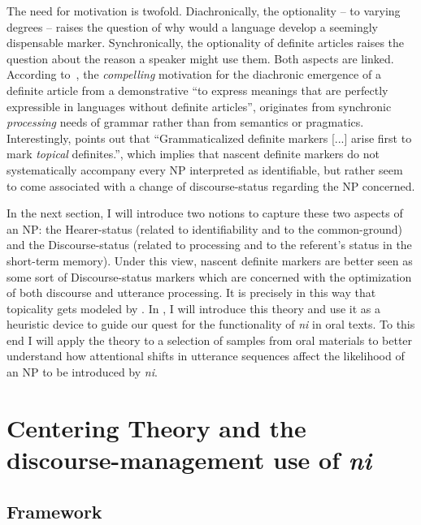 \documentclass[output=paper
,modfonts
,nonflat]{langsci/langscibook}
\begin{document}
The need for motivation is twofold. Diachronically, the optionality -- to varying degrees -- raises the question of why would a language develop a seemingly dispensable marker. Synchronically, the optionality of definite articles raises the question about the reason a speaker might use them. Both aspects are linked. According to~\citet[84]{Hawkins2004}, the \textit{compelling} motivation for the diachronic emergence of a definite article from a demonstrative ``to express meanings that are perfectly expressible in languages without definite articles'', originates from synchronic \textit{processing} needs of grammar rather than from semantics or pragmatics. Interestingly, \citet[474]{Givon2001} points out that ``Grammaticalized definite markers [...] arise first to mark \textit{topical} definites.'', which implies that nascent definite markers do not systematically accompany every NP interpreted as identifiable, but rather seem to come associated with a change of discourse-status regarding the NP concerned. 

In the next section, I will introduce two notions to capture these two aspects of an NP: the Hearer-status (related to identifiability and to the common-ground) and the Discourse-status (related to processing and to the referent's status in the short-term memory). Under this view, nascent definite markers are better seen as some sort of Discourse-status markers which are concerned with the optimization of both discourse and utterance processing. It is precisely in this way that topicality gets modeled by . In , I will introduce this theory and use it as a heuristic device to guide our quest for the functionality of \textit{ni} in oral texts. To this end I will apply the theory to a selection of samples from oral materials to better understand how attentional shifts in utterance sequences affect the likelihood of an NP to be introduced by \textit{ni}.

\section{Centering Theory and the discourse-management use of \textit{ni}}\label{sec:pico:3} 

\subsection{Framework}\label{sec:pico:3.1} 
\end{document}
